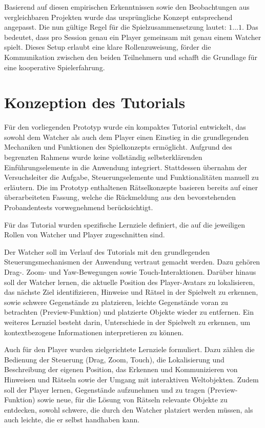 Basierend auf diesen empirischen Erkenntnissen sowie den Beobachtungen aus vergleichbaren Projekten wurde das ursprüngliche Konzept entsprechend angepasst. Die nun gültige Regel für die Spielzusammensetzung lautet: $1\ldots1$. Das bedeutet, dass pro Session genau ein Player gemeinsam mit genau einem Watcher spielt. Dieses Setup erlaubt eine klare Rollenzuweisung, förder die Kommunikation zwischen den beiden Teilnehmern und schafft die Grundlage für eine kooperative Spielerfahrung.

\section{Konzeption des Tutorials}

Für den vorliegenden Prototyp wurde ein kompaktes Tutorial entwickelt, das sowohl dem Watcher als auch dem Player einen Einstieg in die grundlegenden Mechaniken und Funktionen des Spielkonzepts ermöglicht. Aufgrund des begrenzten Rahmens wurde keine vollständig selbsterklärenden Einführungselemente in die Anwendung integriert. Stattdessen übernahm der Versuchsleiter die Aufgabe, Steuerungselemente und Funktionalitäten manuell zu erläutern. Die im Prototyp enthaltenen Rätselkonzepte basieren bereits auf einer überarbeiteten Fassung, welche die Rückmeldung aus den bevorstehenden Probandentests vorwegnehmend berücksichtigt.

Für das Tutorial wurden spezifische Lernziele definiert, die auf die jeweiligen Rollen von Watcher und Player zugeschnitten sind.

Der Watcher soll im Verlauf des Tutorials mit den grundlegenden Steuerungsmechanismen der Anwendung vertraut gemacht werden. Dazu gehören Drag-. Zoom- und Yaw-Bewegungen sowie Touch-Interaktionen. Darüber hinaus soll der Watcher lernen, die aktuelle Position des Player-Avatars zu lokalisieren, das nächste Ziel identifizieren, Hinweise und Rätsel in der Spielwelt zu erkennen, sowie schwere Gegenstände zu platzieren, leichte Gegenstände voran zu betrachten (Preview-Funktion) und platzierte Objekte wieder zu entfernen. Ein weiteres Lernziel besteht darin, Unterschiede in der Spielwelt zu erkennen, um kontextbezogene Informationen interpretieren zu können.

Auch für den Player wurden zielgerichtete Lernziele formuliert. Dazu zählen die Bedienung der Steuerung (Drag, Zoom, Touch), die Lokalisierung und Beschreibung der eigenen Position, das Erkennen und Kommunizieren von Hinweisen und Rätseln sowie der Umgang mit interaktiven Weltobjekten. Zudem soll der Player lernen, Gegenstände aufzunehmen und zu tragen (Preview-Funktion) sowie neue, für die Lösung von Rätseln relevante Objekte zu entdecken, sowohl schwere, die durch den Watcher platziert werden müssen, als auch leichte, die er selbst handhaben kann.

